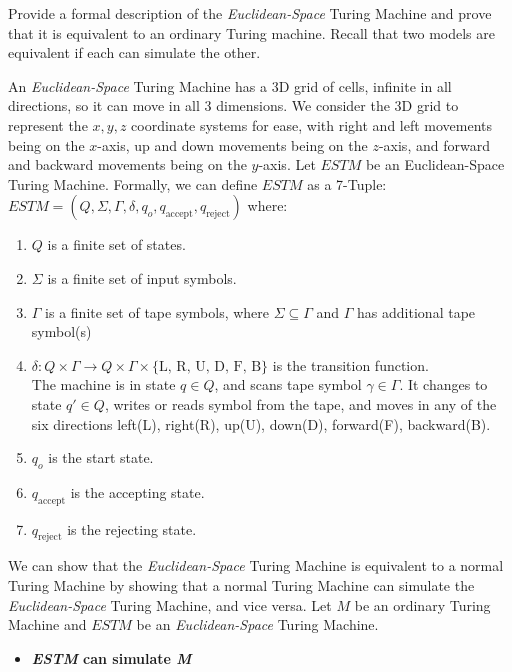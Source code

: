 \documentclass[addpoints,a4paper]{exam}
\begin{document}
\begin{questions}
  Provide a formal description of the \textit{Euclidean-Space} Turing Machine and prove that it is equivalent to an ordinary Turing machine. Recall that two models are equivalent if each can simulate the other.
  \begin{solution}

    An \textit{Euclidean-Space} Turing Machine has a 3D grid of cells, infinite in all directions, so it can move in all 3 dimensions. We consider the 3D grid to represent the $x, y, z$ coordinate systems for ease, with right and left movements being on the $x$-axis, up and down movements being on the $z$-axis, and forward and backward movements being on the $y$-axis. Let $ESTM$ be an Euclidean-Space Turing Machine. Formally, we can define $ESTM$ as a 7-Tuple: $ ESTM = (Q, \Sigma, \Gamma, \delta, q_o, q_\text{accept}, q_\text{reject}) $ where: \vspace*{-2mm}
    \begin{enumerate}
      \item $Q$ is a finite set of states. \vspace*{-1mm}
      \item $\Sigma$ is a finite set of input symbols. \vspace*{-1mm}
      \item $\Gamma$ is a finite set of tape symbols, where $ \Sigma \subseteq \Gamma $ and $\Gamma$ has additional tape symbol(s)
      \item $ \delta: Q \times \Gamma \to Q \times \Gamma \times \{\text{L, R, U, D, F, B}\} $ is the transition function. \\
            The machine is in state $ q \in Q $, and scans tape symbol $ \gamma \in \Gamma $. It changes to state $ q' \in Q $, writes or reads symbol from the tape, and moves in any of the six directions left(L), right(R), up(U), down(D), forward(F), backward(B). \vspace*{-1mm}
      \item $q_o$ is the start state. \vspace*{-1mm}
      \item $ q_\text{accept} $ is the accepting state. \vspace*{-1mm}
      \item $ q_\text{reject} $ is the rejecting state. \vspace*{-1mm}
    \end{enumerate}
    
    We can show that the \textit{Euclidean-Space} Turing Machine is equivalent to a normal Turing Machine by showing that a normal Turing Machine can simulate the \textit{Euclidean-Space} Turing Machine, and vice versa. Let $M$ be an ordinary Turing Machine and $ ESTM $ be an \textit{Euclidean-Space} Turing Machine. 
    \begin{itemize}
      \item \textbf{\textit{ESTM} can simulate \textit{M}}
            

\end{itemize}
\end{solution}
\end{questions}
\end{document}
